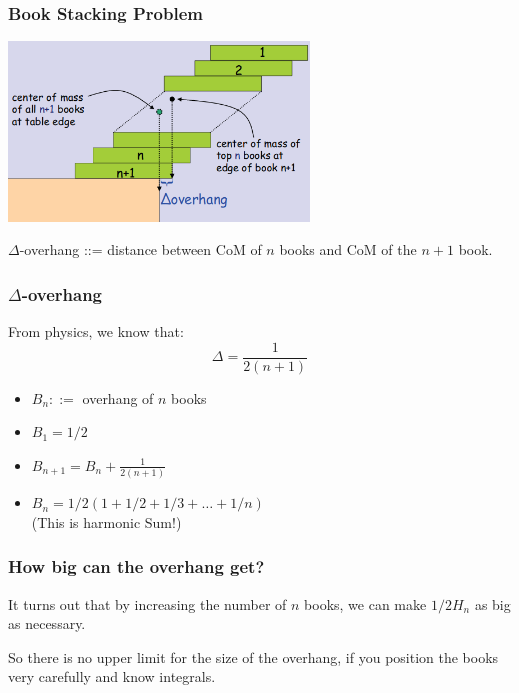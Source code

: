 \documentclass{beamer}
\begin{document}
\begin{frame}
  \frametitle{Book Stacking Problem}
  \begin{center}
    \includegraphics[width=0.6\textwidth]{../img/bookstack3}
  \end{center}

  {\larger $\Delta$-overhang ::= distance between CoM of $n$ books and
    CoM of the $n+1$ book.  }
\end{frame}

\begin{frame}
  \frametitle{$\Delta$-overhang}

  {\larger
    From physics, we know that:
    \begin{equation}
      \Delta = \frac{1}{2(n+1)}
    \end{equation}
    
    \begin{itemize}
    \item $B_n ::=$ overhang of $n$ books
    \item $B_1 = 1/2$
    \item $B_{n+1} = B_n + \frac{1}{2(n+1)}$
      \bigskip
      
    \item $B_n = 1/2(1+1/2+1/3+\ldots+1/n)$\\
      \hfill(This is harmonic Sum!)
    \end{itemize}
  }
\end{frame}

\begin{frame}
  \frametitle{How big can the overhang get?}

  {\larger
    
    It turns out that by increasing the number of $n$ books, we
    can make $1/2H_n$ as big as necessary.

    \vfill

    So there is no upper limit for the size of the overhang, if you
    position the books \alert{very carefully} and know integrals.
  }
\end{frame}
\end{document}
